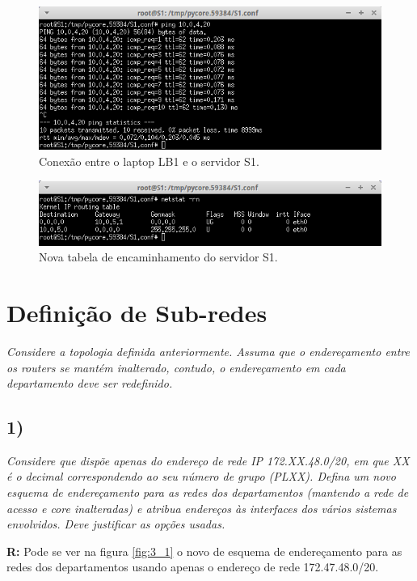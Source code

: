 \documentclass{llncs}
\begin{document}
\begin{figure}[H]
\begin{center}
\includegraphics[scale=0.60]{2e1.png} 
\end{center}
\caption{\label{fig:2e1} Conexão entre o laptop LB1 e o servidor S1.}
\end{figure}

\begin{figure}[H]
\begin{center}
\includegraphics[scale=0.60]{2e2.png} 
\end{center}
\caption{\label{fig:2e2} Nova tabela de encaminhamento do servidor S1.}
\end{figure}

\section{Definição de Sub-redes}
\emph{Considere a topologia definida anteriormente. Assuma que o endereçamento entre os routers se mantém inalterado, contudo, o endereçamento em cada departamento deve ser redefinido. }

\subsection{1)}
\emph{Considere que dispõe apenas do endereço de rede IP 172.XX.48.0/20, em que XX é o decimal correspondendo ao seu número de grupo (PLXX). Defina um novo esquema de endereçamento para as redes dos departamentos (mantendo a rede de acesso e core inalteradas) e atribua endereços às interfaces dos vários sistemas envolvidos. Deve justificar as opções usadas.}
\\ \par
\textbf{R:} Pode se ver na figura \ref{fig:3_1} o novo de esquema de endereçamento para
as redes dos departamentos usando apenas o endereço de rede 172.47.48.0/20.
\end{document}
